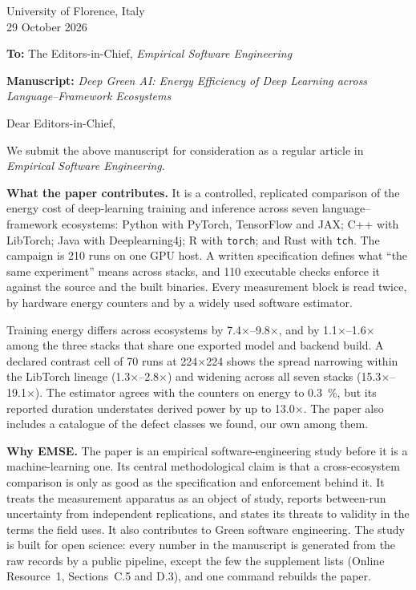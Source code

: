 \documentclass[11pt,a4paper]{article}
\begin{document}
\begin{flushright}
University of Florence, Italy\\
29 October 2026
\end{flushright}
\vspace{-0.5\baselineskip}

\textbf{To:} The Editors-in-Chief, \textit{Empirical Software Engineering}

{ \textbf{Manuscript:} \textit{Deep Green AI: Energy Efficiency of Deep Learning across
Language--Framework Ecosystems}\par}

Dear Editors-in-Chief,

We submit the above manuscript for consideration as a regular article in
\textit{Empirical Software Engineering}.

\textbf{What the paper contributes.} It is a controlled, replicated comparison of
the energy cost of deep-learning training and inference across seven
language--framework ecosystems: Python with PyTorch, TensorFlow and JAX; C++ with
LibTorch; Java with Deeplearning4j; R with \texttt{torch}; and Rust with \texttt{tch}. The
campaign is 210 runs on one GPU host. A written specification defines what ``the
same experiment'' means across stacks, and 110 executable checks enforce it
against the source and the built binaries. Every measurement block is read
twice, by hardware energy counters and by a widely used software estimator.

Training energy differs across ecosystems by \mbox{7.4$\times$--9.8$\times$}, and by \mbox{1.1$\times$--1.6$\times$} among
the three stacks that share one exported model and backend build. A declared
contrast cell of 70 runs at 224$\times$224 shows the spread narrowing within the
LibTorch lineage (\mbox{1.3$\times$--2.8$\times$}) and widening across all seven stacks
(\mbox{15.3$\times$--19.1$\times$}). The estimator agrees with the counters on energy to 0.3~\%, but
its reported duration understates derived power by up to 13.0$\times$. The paper also
includes a catalogue of the defect classes we found, our own among them.

\textbf{Why EMSE.} The paper is an empirical software-engineering study before it is
a machine-learning one. Its central methodological claim is that a
cross-ecosystem comparison is only as good as the specification and enforcement
behind it. It treats the measurement apparatus as an object of study, reports
between-run uncertainty from independent replications, and states its threats
to validity in the terms the field uses. It also contributes to Green software
engineering. The study is built for open
science: every number in the manuscript is generated from the raw records by a
public pipeline, except the few the supplement lists (Online Resource~1,
Sections~C.5 and D.3), and one command rebuilds the paper.
\end{document}

